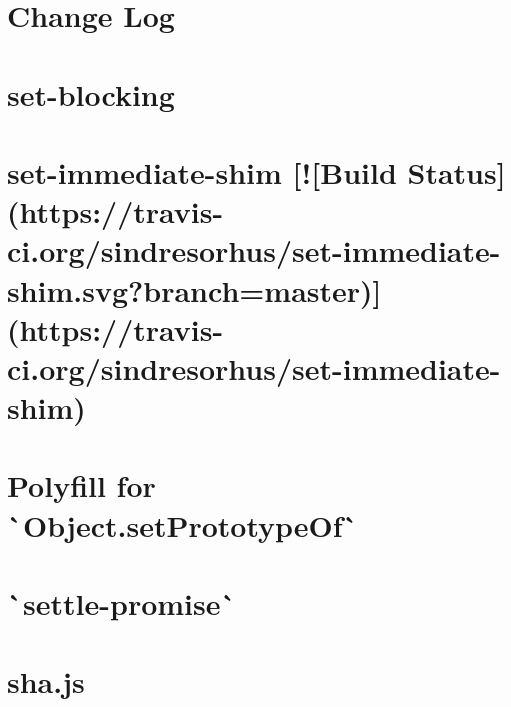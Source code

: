 \documentclass[twoside]{book}
\newcommand{\+}{\discretionary{\mbox{\scriptsize$\hookleftarrow$}}{}{}}
\begin{document}
\chapter{Change Log}
\label{md__c_1_workspace_demo_src_main_script_node_modules_set-blocking__c_h_a_n_g_e_l_o_g}

\chapter{set-\/blocking}
\label{md__c_1_workspace_demo_src_main_script_node_modules_set-blocking__r_e_a_d_m_e}

\chapter{set-\/immediate-\/shim \mbox{[}!\mbox{[}Build Status\mbox{]}(https\+://travis-\/ci.org/sindresorhus/set-\/immediate-\/shim.svg?branch=master)\mbox{]}(https\+://travis-\/ci.org/sindresorhus/set-\/immediate-\/shim)}
\label{md__c_1_workspace_demo_src_main_script_node_modules_set-immediate-shim_readme}

\chapter{Polyfill for \`{}\+Object.set\+Prototype\+Of\`{}}
\label{md__c_1_workspace_demo_src_main_script_node_modules_setprototypeof__r_e_a_d_m_e}

\chapter{\`{}settle-\/promise\`{}}
\label{md__c_1_workspace_demo_src_main_script_node_modules_settle-promise__r_e_a_d_m_e}

\chapter{sha.\+js}
\label{md__c_1_workspace_demo_src_main_script_node_modules_sha_8js__r_e_a_d_m_e}

\end{document}
